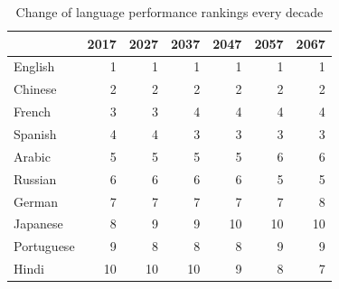 \begin{table}[H]
	\centering
	\caption{Change of language performance rankings every decade}
	\begin{tabular}{|p{5.22em}|r|r|r|r|r|r|}
		\toprule
		\multicolumn{1}{|r|}{\backslashbox[0pt][l]{Language}{Year}} & 2017  & 2027  & 2037  & 2047  & 2057  & 2067 \\
		\midrule
		English & 1     & 1     & 1     & 1     & 1     & 1 \\
		\midrule
		Chinese & 2     & 2     & 2     & 2     & 2     & 2 \\
		\midrule
		French & 3     & 3     & 4     & 4     & 4     & 4 \\
		\midrule
		Spanish & 4     & 4     & 3     & 3     & 3     & 3 \\
		\midrule
		Arabic & 5     & 5     & 5     & 5     & 6     & 6 \\
		\midrule
		Russian & 6     & 6     & 6     & 6     & 5     & 5 \\
		\midrule
		German & 7     & 7     & 7     & 7     & 7     & 8 \\
		\midrule
		Japanese & 8     & 9     & 9     & 10    & 10    & 10 \\
		\midrule
		Portuguese & 9     & 8     & 8     & 8     & 9     & 9 \\
		\midrule
		Hindi & 10    & 10    & 10    & 9     & 8     & 7 \\
		\bottomrule
	\end{tabular}%
	\label{tab:Change}%
\end{table}%



